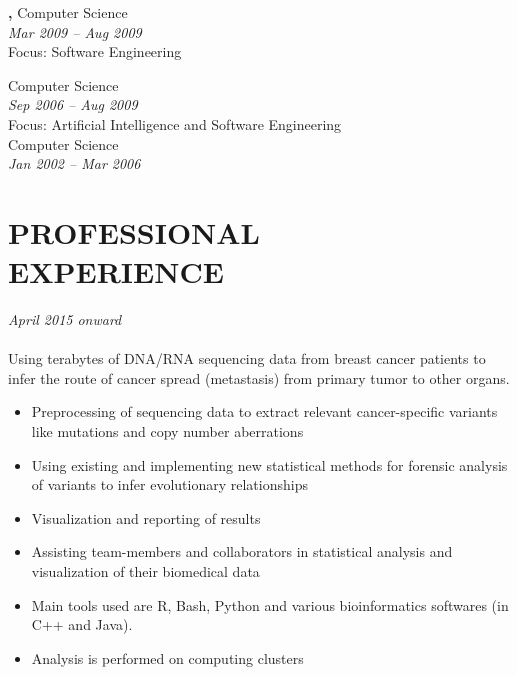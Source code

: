 \documentclass[margin, 10pt]{res} %
\begin{document}
\begin{resume}
{\bf \color{Black}{Exchange Student},} Computer Science \\
{\color{RubineRed}{University of Limerick, Ireland}} \hfill \textit{Mar 2009 -- Aug 2009} \\
Focus: Software Engineering 

{\bf \color{Black}{Master of Science,}} Computer Science \\ %
{\color{RubineRed}{Lahore University of Management Sciences, Pakistan}} \hfill \textit{Sep 2006 -- Aug 2009} \\
Focus: Artificial Intelligence and Software Engineering \\

{\bf \color{Black}{Bachelor of Science,}} Computer Science \\ %
{\color{RubineRed}{University of Peshawar, Pakistan}} \hfill \textit{Jan 2002 -- Mar 2006} \\


\section{PROFESSIONAL \\ EXPERIENCE}

{\sl \textbf{}} \hfill \textit{April 2015 onward} \\
{\color{RubineRed}{Karolinska Institute, Sweden}} \\
Using terabytes of DNA/RNA sequencing data from breast cancer patients to infer the route of cancer spread (metastasis) from primary tumor to other organs. 
\begin{itemize} 
\item Preprocessing of sequencing data to extract relevant cancer-specific variants like mutations and copy number aberrations
\item Using existing and implementing new statistical methods for forensic analysis of variants to infer evolutionary relationships
\item Visualization and reporting of results
\item Assisting team-members and collaborators in statistical analysis and visualization of their biomedical data 
\item Main tools used are R, Bash, Python and various bioinformatics softwares (in C++ and Java). 
\item Analysis is performed on computing clusters
\end{itemize} 


\end{resume}
\end{document}
